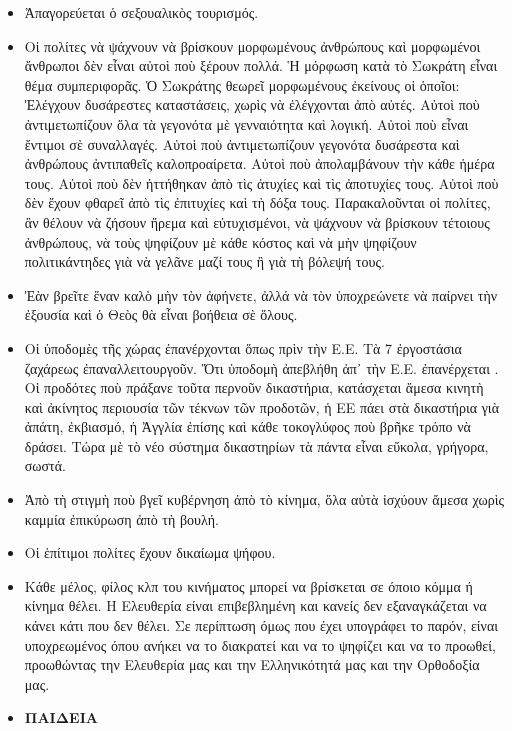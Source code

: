\documentclass[a4paper]{article}
\begin{document}
\begin{itemize}
\item Ἀπαγορεύεται ὁ σεξουαλικὸς τουρισμός.
\item Οἱ πολίτες νὰ ψάχνουν νὰ βρίσκουν μορφωμένους ἀνθρώπους καὶ μορφωμένοι ἄνθρωποι δὲν εἶναι αὐτοὶ ποὺ ξέρουν πολλά. Ἡ μόρφωση κατὰ τὸ Σωκράτη εἶναι θέμα συμπεριφορᾶς. Ὁ Σωκράτης θεωρεῖ μορφωμένους ἐκείνους οἱ ὁποῖοι: Ἐλέγχουν δυσάρεστες καταστάσεις, χωρὶς νὰ ἐλέγχονται ἀπὸ αὐτές. Αὐτοὶ ποὺ ἀντιμετωπίζουν ὅλα τὰ γεγονότα μὲ γενναιότητα καὶ λογική. Αὐτοὶ ποὺ εἶναι ἔντιμοι σὲ συναλλαγές. Αὐτοὶ ποὺ ἀντιμετωπίζουν γεγονότα δυσάρεστα καὶ ἀνθρώπους ἀντιπαθεῖς καλοπροαίρετα. Αὐτοὶ ποὺ ἀπολαμβάνουν τὴν κάθε ἡμέρα τους. Αὐτοὶ ποὺ δὲν ἡττήθηκαν ἀπὸ τὶς ἀτυχίες καὶ τὶς ἀποτυχίες τους. Αὐτοὶ ποὺ δὲν ἔχουν φθαρεῖ ἀπὸ τὶς ἐπιτυχίες καὶ τὴ δόξα τους. Παρακαλοῦνται οἱ πολίτες, ἂν θέλουν νὰ ζήσουν ἤρεμα καὶ εὐτυχισμένοι, νὰ ψάχνουν νὰ βρίσκουν τέτοιους ἀνθρώπους, νὰ τοὺς ψηφίζουν μὲ κάθε κόστος καὶ νὰ μὴν ψηφίζουν πολιτικάντηδες γιὰ νὰ γελᾶνε μαζί τους ἢ γιὰ τὴ βόλεψή τους.
\item Ἐὰν βρεῖτε ἕναν καλὸ μὴν τὸν ἀφήνετε, ἀλλά νὰ τὸν ὑποχρεώνετε νὰ παίρνει τὴν ἐξουσία καὶ ὁ Θεὸς θὰ εἶναι βοήθεια σὲ ὅλους.
\item Οἱ ὑποδομὲς τῆς χώρας ἐπανέρχονται ὅπως πρὶν τὴν Ε.Ε. Τὰ 7 ἐργοστάσια ζαχάρεως ἐπαναλλειτουργοῦν. Ὅτι ὑποδομὴ ἀπεβλήθη ἀπ᾿ τὴν Ε.Ε. ἐπανέρχεται . Οἱ προδότες ποὺ πράξανε τοῦτα περνοῦν δικαστήρια, κατάσχεται ἄμεσα κινητὴ καὶ ἀκίνητος περιουσία τῶν τέκνων τῶν προδοτῶν, ἡ ΕΕ πάει στὰ δικαστήρια γιὰ ἀπάτη, ἐκβιασμό, ἡ Ἀγγλία ἐπίσης καὶ κάθε τοκογλύφος ποὺ βρῆκε τρόπο νὰ δράσει. Τώρα μὲ τὸ νέο σύστημα δικαστηρίων τὰ πάντα εἶναι εὔκολα, γρήγορα, σωστά.
\item Ἀπὸ τὴ στιγμὴ ποὺ βγεῖ κυβέρνηση ἀπὸ τὸ κίνημα, ὅλα αὐτὰ ἰσχύουν ἄμεσα χωρὶς καμμία ἐπικύρωση ἀπὸ τὴ βουλή. 
\item Οἱ ἑπίτιμοι πολίτες ἔχουν δικαίωμα ψήφου.
\item Κάθε μέλος, φίλος κλπ του κινήματος μπορεί να βρίσκεται σε όποιο κόμμα ή κίνημα θέλει. Η Ελευθερία είναι επιβεβλημένη και κανείς δεν εξαναγκάζεται να κάνει κάτι που δεν θέλει. Σε περίπτωση όμως που έχει υπογράφει το παρόν, είναι υποχρεωμένος όπου ανήκει να το διακρατεί και να το ψηφίζει και να το προωθεί, προωθώντας την Ελευθερία μας και την Ελληνικότητά μας και την Ορθοδοξία μας.

\item  \textbf{ΠΑΙΔΕΙΑ}


\end{itemize}
\end{document}
